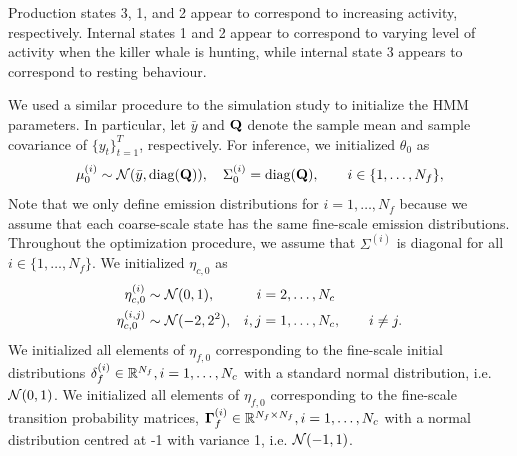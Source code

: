 %
Production states 3, 1, and 2 appear to correspond to increasing activity, respectively. Internal states 1 and 2 appear to correspond to varying level of activity when the killer whale is hunting, while internal state 3 appears to correspond to resting behaviour.

We used a similar procedure to the simulation study to initialize the HMM parameters. In particular, let $\bar y$ and $\mathbf{Q}$ denote the sample mean and sample covariance of $\{y_t\}_{t=1}^T$, respectively. For inference, we initialized $\theta_0$ as
%
\begin{equation*}
    \mu^{(i)}_0 \sim \mathcal{N}(\bar y, \text{diag}(\mathbf{Q})), \quad \Sigma^{(i)}_0 = \text{diag}(\mathbf{Q}), \qquad i \in \{1,\ldots,N_f\},
\end{equation*}
%
Note that we only define emission distributions for $i = 1,\ldots,N_f$ because we assume that each coarse-scale state has the same fine-scale emission distributions.
Throughout the optimization procedure, we assume that $\Sigma^{(i)}$ is diagonal for all $i \in \{1,\ldots,N_f\}$.
%
We initialized $\eta_{c,0}$ as
%
\begin{align*}
    \eta^{(i)}_{c,0} &\sim \mathcal{N}(0,1), & i & = 2,\ldots,N_c \\
    \eta^{(i,j)}_{c,0} &\sim \mathcal{N}(-2,2^2), & i,j & = 1,\ldots,N_c, \qquad i \neq j.
\end{align*}
%
We initialized all elements of $\eta_{f,0}$ corresponding to the fine-scale initial distributions $\delta^{(i)}_f \in \mathbb{R}^{N_f}, i = 1,\ldots,N_c$ with a standard normal distribution, i.e. $\mathcal{N}(0,1)$. We initialized all elements of $\eta_{f,0}$ corresponding to the fine-scale transition probability matrices, $\mathbf{\Gamma}^{(i)}_f \in {\mathbb{R}^{N_f \times N_f}}, i = 1,\ldots,N_c$ with a normal distribution centred at -1 with variance 1, i.e. $\mathcal{N}(-1,1)$.


